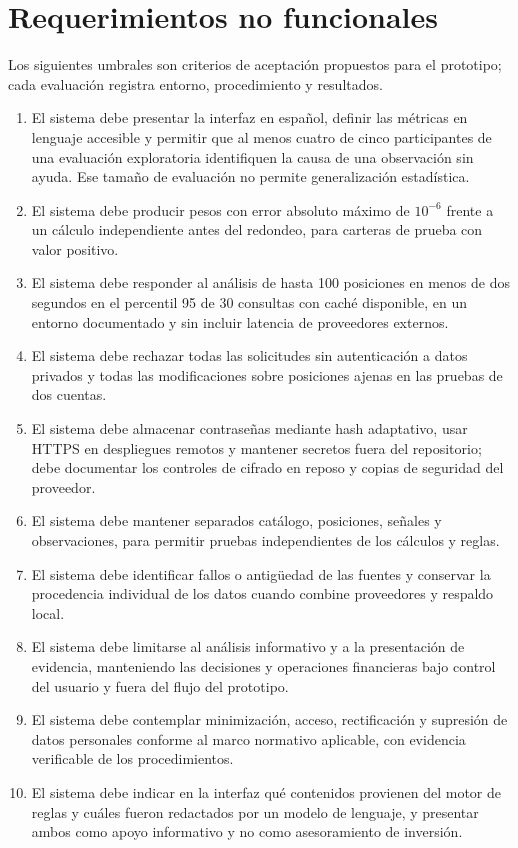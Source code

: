 \section{Requerimientos no funcionales}\label{sec:req-no-funcionales}

Los siguientes umbrales son criterios de aceptación propuestos para el prototipo; cada evaluación registra entorno, procedimiento y resultados.
\begin{enumerate}[label=RNF\arabic*.,leftmargin=*]
\item El sistema debe presentar la interfaz en español, definir las métricas en lenguaje accesible y permitir que al menos cuatro de cinco participantes de una evaluación exploratoria identifiquen la causa de una observación sin ayuda. Ese tamaño de evaluación no permite generalización estadística.
\item El sistema debe producir pesos con error absoluto máximo de $10^{-6}$ frente a un cálculo independiente antes del redondeo, para carteras de prueba con valor positivo.
\item El sistema debe responder al análisis de hasta 100 posiciones en menos de dos segundos en el percentil 95 de 30 consultas con caché disponible, en un entorno documentado y sin incluir latencia de proveedores externos.
\item El sistema debe rechazar todas las solicitudes sin autenticación a datos privados y todas las modificaciones sobre posiciones ajenas en las pruebas de dos cuentas.
\item El sistema debe almacenar contraseñas mediante hash adaptativo, usar HTTPS en despliegues remotos y mantener secretos fuera del repositorio; debe documentar los controles de cifrado en reposo y copias de seguridad del proveedor.
\item El sistema debe mantener separados catálogo, posiciones, señales y observaciones, para permitir pruebas independientes de los cálculos y reglas.
\item El sistema debe identificar fallos o antigüedad de las fuentes y conservar la procedencia individual de los datos cuando combine proveedores y respaldo local.
\item El sistema debe limitarse al análisis informativo y a la presentación de evidencia, manteniendo las decisiones y operaciones financieras bajo control del usuario y fuera del flujo del prototipo.
\item El sistema debe contemplar minimización, acceso, rectificación y supresión de datos personales conforme al marco normativo aplicable, con evidencia verificable de los procedimientos.
\item El sistema debe indicar en la interfaz qué contenidos provienen del motor de reglas y cuáles fueron redactados por un modelo de lenguaje, y presentar ambos como apoyo informativo y no como asesoramiento de inversión.
\end{enumerate}

